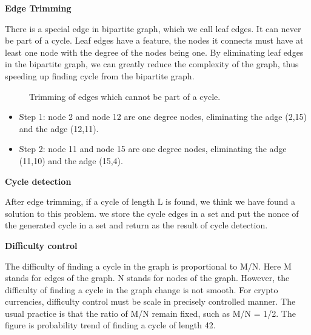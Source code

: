 \documentclass[a4paper,11pt]{article}
\begin{document}
\textbf{Edge Trimming}

There is a special edge in bipartite graph, which we call leaf edges. It can never be part of a cycle.
Leaf edges have a feature, the nodes it connects must have at least one node with the degree of the nodes being one.
By eliminating leaf edges in the bipartite graph, we can greatly reduce the complexity of the graph,
thus speeding up finding cycle from the bipartite graph.

\begin{figure}[h]
	\centerline{%
	}
	\caption{Trimming of edges which cannot be part of a cycle.}
\end{figure}

\begin{itemize}
	\item Step 1: node 2 and node 12 are one degree nodes, eliminating the adge (2,15) and the adge (12,11).
	\item Step 2: node 11 and node 15 are one degree nodes, eliminating the adge (11,10) and the adge (15,4).
\end{itemize}


\textbf{Cycle detection}

After edge trimming, if a cycle of length L is found, we think we have found a solution to this problem.
we store the cycle edges in a set and put the nonce of the generated cycle in a set and
return as the result of cycle detection.


\textbf{Difficulty control}

The difficulty of finding a cycle in the graph is proportional to M/N. Here M stands for edges of the graph.
N stands for nodes of the graph. However, the difficulty of finding a cycle in the graph change is not smooth.
For crypto currencies, difficulty control must be scale in precisely controlled manner. The usual practice is
that the ratio of M/N remain fixed, such as M/N = 1/2.
The figure is probability trend of finding a cycle of length 42.
\end{document}
